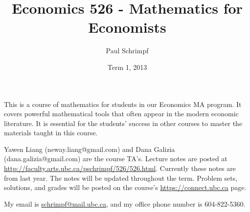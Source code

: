 \documentclass[10pt]{article}
\title{Economics 526 - Mathematics for Economists}
\date{Term 1, 2013}
\author{Paul Schrimpf}
\begin{document}
\maketitle

This is a course of mathematics for students in our Economics MA
program. It covers powerful mathematical tools that often appear
in the modern economic literature. It is essential for the students'
success in other courses to master the materials taught in this
course.

Yawen Liang (neway.liang@gmail.com) and Dana Galizia
(dana.galizia@gmail.com) are the course TA's.  Lecture notes are
posted at
\url{http://faculty.arts.ubc.ca/pschrimpf/526/526.html}. Currently
these notes are from last year. The notes will be updated throughout
the term. Problem sets, solutions, and grades will be posted on the
course's \url{https://connect.ubc.ca} page.

 My email is
\href{mailto:schrimp@mail.ubc.ca}{schrimpf@mail.ubc.ca}, and my office
phone number is 604-822-5360.
\end{document}
